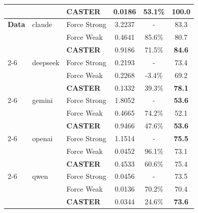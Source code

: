 \documentclass{article}
\theoremstyle{plain}
\theoremstyle{definition}
\theoremstyle{remark}
\begin{document}
\begin{table}[t]
\begin{minipage}{0.48\textwidth}
{\begin{tabular}{lllccc}
             &  & \textbf{CASTER} & 0.0186 & 53.1\% & \textbf{100.0} \\
            \midrule
            \textbf{Data} & claude & Force Strong & 3.2237 & - & 83.3 \\
             &  & Force Weak & 0.4641 & 85.6\% & 80.7 \\
             &  & \textbf{CASTER} & 0.9186 & 71.5\% & \textbf{84.6} \\
             \cmidrule{2-6}
             & deepseek & Force Strong & 0.2193 & - & 73.4 \\
             &  & Force Weak & 0.2268 & -3.4\% & 69.2 \\
             &  & \textbf{CASTER} & 0.1332 & 39.3\% & \textbf{78.1} \\
             \cmidrule{2-6}
             & gemini & Force Strong & 1.8052 & - & \textbf{53.6} \\
             &  & Force Weak & 0.4665 & 74.2\% & 52.1 \\
             &  & \textbf{CASTER} & 0.9466 & 47.6\% & \textbf{53.6} \\
             \cmidrule{2-6}
             & openai & Force Strong & 1.1514 & - & \textbf{75.5} \\
             &  & Force Weak & 0.0452 & 96.1\% & 73.1 \\
             &  & \textbf{CASTER} & 0.4533 & 60.6\% & 75.4 \\
             \cmidrule{2-6}
             & qwen & Force Strong & 0.0456 & - & 73.5 \\
             &  & Force Weak & 0.0136 & 70.2\% & 70.4 \\
             &  & \textbf{CASTER} & 0.0344 & 24.6\% & \textbf{73.6} \\
            \bottomrule
        \end{tabular}%
        }
    \end{minipage}
    \hfill
    \begin{minipage}{0.48\textwidth}
        \centering
\end{minipage}
\end{table}
\end{document}
